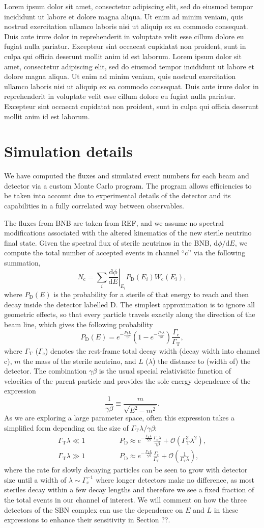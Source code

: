 \documentclass[11pt, a4paper]{article}
\newcommand{\lorem}{ \textcolor[rgb]{0.8,0.8,0.8}{Lorem ipsum dolor sit amet, consectetur
adipiscing elit, sed do eiusmod tempor incididunt ut labore et dolore magna
aliqua. Ut enim ad minim veniam, quis nostrud exercitation ullamco laboris nisi
ut aliquip ex ea commodo consequat. Duis aute irure dolor in reprehenderit in
voluptate velit esse cillum dolore eu fugiat nulla pariatur. Excepteur sint
occaecat cupidatat non proident, sunt in culpa qui officia deserunt mollit anim
id est laborum.}}
\begin{document}
\lorem\lorem

\section{Simulation details}

We have computed the fluxes and simulated event numbers for each beam and
detector via a custom Monte Carlo program. The program allows efficiencies to
be taken into account due to experimental details of the detector and its
capabilities in a fully correlated way between observables. 

The fluxes from BNB are taken from REF, and we assume no spectral modifications
associated with the altered kinematics of the new sterile neutrino final state.
%
Given the spectral flux of sterile neutrinos in the BNB,
$\mathrm{d}\phi/\mathrm{d}E$, we compute the total number of accepted events in
channel ``$\text{c}$'' via the following summation,
%
\[ N_\text{c} = \sum_{i} \left .
\frac{\mathrm{d}\phi}{\mathrm{d}E}\right|_{E_i} P_\text{D}\left(E_i\right)
W_\text{c}\left(E_i\right),  \]
%
where $P_\text{D}(E)$ is the probability for a sterile of that energy to reach
and then decay inside the detector labelled $\text{D}$. The simplest
approximation is to ignore all geometric effects, so that every particle
travels exactly along the direction of the beam line, which gives the following
probability 
%
\[ P_\text{D}\left(E\right) = e^{-\frac{\Gamma_\text{T}L}{\gamma\beta}}\left(
1-
e^{-\frac{\Gamma_\text{T}\lambda}{\gamma\beta}}\right)\frac{\Gamma_\text{c}}{\Gamma_\text{T}},
\]
%
where $\Gamma_\text{T}$ ($\Gamma_\text{c}$) denotes the rest-frame total decay
width (decay width into channel $\text{c}$), $m$ the mass of the sterile
neutrino, and $L$ ($\lambda$) the distance to (width of) the detector. The
combination $\gamma\beta$ is the usual special relativisitic function of
velocities of the parent particle and provides the sole energy dependence of
the expression
%
\[   \frac{1}{\gamma\beta} \equiv \frac{m}{\sqrt{E^2-m^2}}. \]
%
As we are exploring a large parameter space, often this expression takes a
simplified form depending on the size of $\Gamma_\text{T}\lambda/\gamma\beta$:
%
\begin{align*} 
%
\Gamma_\text{T}\lambda \ll 1\qquad&\qquad P_\text{D} \approx
e^{-\frac{\Gamma_\text{T}L}{\gamma\beta}}\frac{\Gamma_\text{c}\lambda}{\gamma\beta}
+ \mathcal{O}\left(\Gamma_\text{T}^2\lambda^2\right),\\ 
%
\Gamma_\text{T}\lambda \gg 1\qquad&\qquad P_\text{D} \approx
e^{-\frac{\Gamma_\text{T}L}{\gamma\beta}}\frac{\Gamma_\text{c}}{\Gamma_\text{T}}
+ \mathcal{O}\left(\frac{1}{\Gamma_\text{T}\lambda}\right), 
%
\end{align*}
%
where the rate for slowly decaying particles can be seen to grow with detector
size until a width of $\lambda\sim\Gamma_\text{c}^{-1}$ where longer detectors
make no difference, as most steriles decay within a few decay lengths and
therefore we see a fixed fraction of the total events in our channel of interest. 
We will comment on how the three detectors of the SBN complex can use the 
dependence on $E$ and $L$ in these expressions to enhance their sensitivity in 
Section ??.
\end{document}
